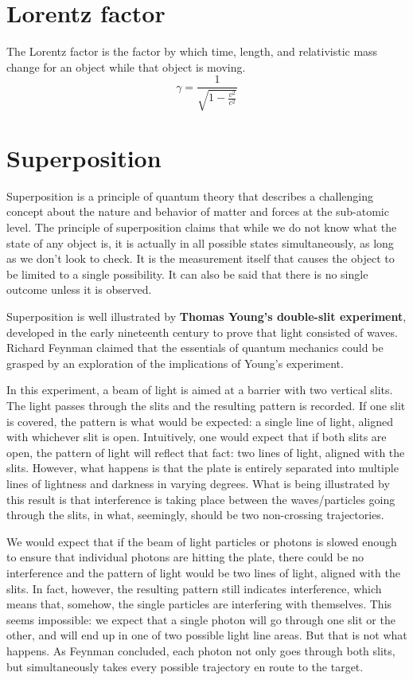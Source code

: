 \documentclass[oneside]{book} %
\theoremstyle{plain}
\newcommand*\reciprocal[1]{\frac{1}{#1}}
\begin{document}
\section{Lorentz factor}
The Lorentz factor is the factor by which time, length, and relativistic mass
change for an object while that object is moving.
\[\gamma = \reciprocal{\sqrt{1 - \frac{v^2}{c^2}}}\]

\section{Superposition}
Superposition is a principle of quantum theory that describes a challenging
concept about the nature and behavior of matter and forces at the sub-atomic
level. The principle of superposition claims that while we do not know what the
state of any object is, it is actually in all possible states simultaneously,
as long as we don't look to check. It is the measurement itself that causes the
object to be limited to a single possibility. It can also be said that there is
no single outcome unless it is observed.

Superposition is well illustrated by \textbf{Thomas Young's double-slit
experiment}, developed in the early nineteenth century to prove that light
consisted of waves. Richard Feynman claimed that the essentials of quantum
mechanics could be grasped by an exploration of the implications of Young's
experiment.

In this experiment, a beam of light is aimed at a barrier with two vertical
slits.  The light passes through the slits and the resulting pattern is
recorded.  If one slit is covered, the pattern is what would be expected: a
single line of light, aligned with whichever slit is open. Intuitively, one
would expect that if both slits are open, the pattern of light will reflect
that fact: two lines of light, aligned with the slits.  However, what happens
is that the plate is entirely separated into multiple lines of lightness and
darkness in varying degrees.  What is being illustrated by this result is that
interference is taking place between the waves/particles going through the
slits, in what, seemingly, should be two non-crossing trajectories.

We would expect that if the beam of light particles or photons is slowed enough
to ensure that individual photons are hitting the plate, there could be no
interference and the pattern of light would be two lines of light, aligned with
the slits. In fact, however, the resulting pattern still indicates
interference, which means that, somehow, the single particles are interfering
with themselves. This seems impossible: we expect that a single photon will go
through one slit or the other, and will end up in one of two possible light
line areas. But that is not what happens. As Feynman concluded, each photon not
only goes through both slits, but simultaneously takes every possible
trajectory en route to the target.
\end{document}
